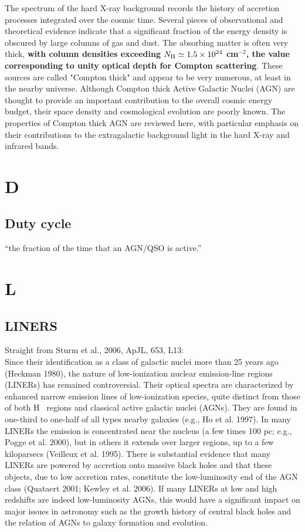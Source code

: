 \documentclass[11pt]{article}
\begin{document}
    The spectrum of the hard X-ray background records the history of
    accretion processes integrated over the cosmic time. Several pieces of
    observational and theoretical evidence indicate that a significant
    fraction of the energy density is obscured by large columns of gas and
    dust. The absorbing matter is often very thick, {\bf with column densities
      exceeding $N_{\rm H} \simeq 1.5 \times10^{24}$ cm$^{-2}$, the value corresponding to unity
      optical depth for Compton scattering}. These sources are called
    "Compton thick" and appear to be very numerous, at least in the nearby
    universe. Although Compton thick Active Galactic Nuclei (AGN) are
    thought to provide an important contribution to the overall cosmic
    energy budget, their space density and cosmological evolution are
    poorly known. The properties of Compton thick AGN are reviewed here,
    with particular emphasis on their contributions to the extragalactic
    background light in the hard X-ray and infrared bands.
    
\section{D}
    \subsection{Duty cycle}
    ``the fraction of the time that an AGN/QSO is active.''


\section{L}
\subsection{LINERS}
Straight from Sturm et al., 2006, ApJL, 653, L13:\\
Since their identification as a class of galactic nuclei more than 25
years ago (Heckman 1980), the nature of low-ionization nuclear
emission-line regions (LINERs) has remained controversial. Their
optical spectra are characterized by enhanced narrow emission lines
of low-ionization species, quite distinct from those of both {H~} 
regions and classical active galactic nuclei (AGNs). They are found in
one-third to one-half of all types nearby galaxies (e.g., Ho et
al. 1997). In many LINERs the emission is concentrated near the
nucleus (a few times 100 pc; e.g., Pogge et al. 2000), but in others
it extends over larger regions, up to a few kiloparsecs (Veilleux et
al. 1995). There is substantial evidence that many LINERs are powered
by accretion onto massive black holes and that these objects, due to
low accretion rates, constitute the low-luminosity end of the AGN
class (Quataert 2001; Kewley et al. 2006). If many LINERs at low and
high redshifts are indeed low-luminosity AGNs, this would have a
significant impact on major issues in astronomy such as the growth
history of central black holes and the relation of AGNs to galaxy
formation and evolution.
\end{document}

